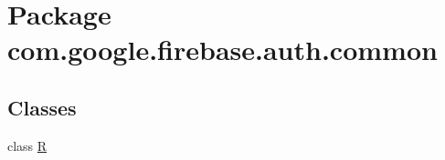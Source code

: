 \hypertarget{namespacecom_1_1google_1_1firebase_1_1auth_1_1common}{}\section{Package com.\+google.\+firebase.\+auth.\+common}
\label{namespacecom_1_1google_1_1firebase_1_1auth_1_1common}
\subsection*{Classes}
\begin{DoxyCompactItemize}
\item 
class \mbox{\hyperlink{classcom_1_1google_1_1firebase_1_1auth_1_1common_1_1R}{R}}
\end{DoxyCompactItemize}
